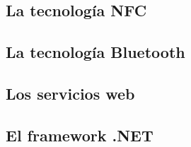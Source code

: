 


  \subsection{La tecnología NFC}

  \subsection{La tecnología Bluetooth}

  \subsection{Los servicios web}

  \subsection{El framework .NET}

